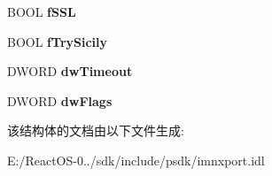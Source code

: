 \begin{DoxyCompactItemize}
\mbox{\label{struct_i_n_e_t_s_e_r_v_e_r_a403a2244ac4191e685cee0d6d91499db}} 
B\+O\+OL {\bfseries f\+S\+SL}
\item 
\mbox{\label{struct_i_n_e_t_s_e_r_v_e_r_a25824941511ed39a24686d63ab9444c6}} 
B\+O\+OL {\bfseries f\+Try\+Sicily}
\item 
\mbox{\label{struct_i_n_e_t_s_e_r_v_e_r_a007babdd69a5db1e11957a6f98a52b49}} 
D\+W\+O\+RD {\bfseries dw\+Timeout}
\item 
\mbox{\label{struct_i_n_e_t_s_e_r_v_e_r_a7364cf00f36870a7649a6707ea2e6b7b}} 
D\+W\+O\+RD {\bfseries dw\+Flags}
\end{DoxyCompactItemize}


该结构体的文档由以下文件生成\+:\begin{DoxyCompactItemize}
\item 
E\+:/\+React\+O\+S-\/0../sdk/include/psdk/imnxport.\+idl\end{DoxyCompactItemize}
